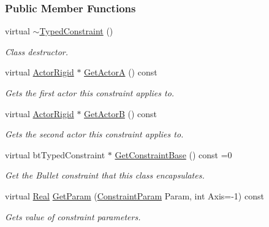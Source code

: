 \subsubsection*{Public Member Functions}
\begin{DoxyCompactItemize}
\item 
virtual \hyperlink{classMezzanine_1_1TypedConstraint_aebd4b22e76d1f693640436083d57f170}{$\sim$TypedConstraint} ()
\begin{DoxyCompactList}\small\item\em Class destructor. \item\end{DoxyCompactList}\item 
virtual \hyperlink{classMezzanine_1_1ActorRigid}{ActorRigid} $\ast$ \hyperlink{classMezzanine_1_1TypedConstraint_a9243a78d94c136d127489b7780ad90d3}{GetActorA} () const 
\begin{DoxyCompactList}\small\item\em Gets the first actor this constraint applies to. \item\end{DoxyCompactList}\item 
virtual \hyperlink{classMezzanine_1_1ActorRigid}{ActorRigid} $\ast$ \hyperlink{classMezzanine_1_1TypedConstraint_a913d8cad2ce92bd3907bc40dc1a5afb8}{GetActorB} () const 
\begin{DoxyCompactList}\small\item\em Gets the second actor this constraint applies to. \item\end{DoxyCompactList}\item 
virtual btTypedConstraint $\ast$ \hyperlink{classMezzanine_1_1TypedConstraint_a7aa13fc4448cf1fc32673bde4ec84767}{GetConstraintBase} () const =0
\begin{DoxyCompactList}\small\item\em Get the Bullet constraint that this class encapsulates. \item\end{DoxyCompactList}\item 
virtual \hyperlink{namespaceMezzanine_a726731b1a7df72bf3583e4a97282c6f6}{Real} \hyperlink{classMezzanine_1_1TypedConstraint_a47138ce9b9cec7af41b3c6fa57985cd5}{GetParam} (\hyperlink{namespaceMezzanine_a6c62e8c2938fb203eb7a7072c12176f4}{ConstraintParam} Param, int Axis=-\/1) const 
\begin{DoxyCompactList}\small\item\em Gets value of constraint parameters. \item\end{DoxyCompactList}\item 

\end{DoxyCompactItemize}
